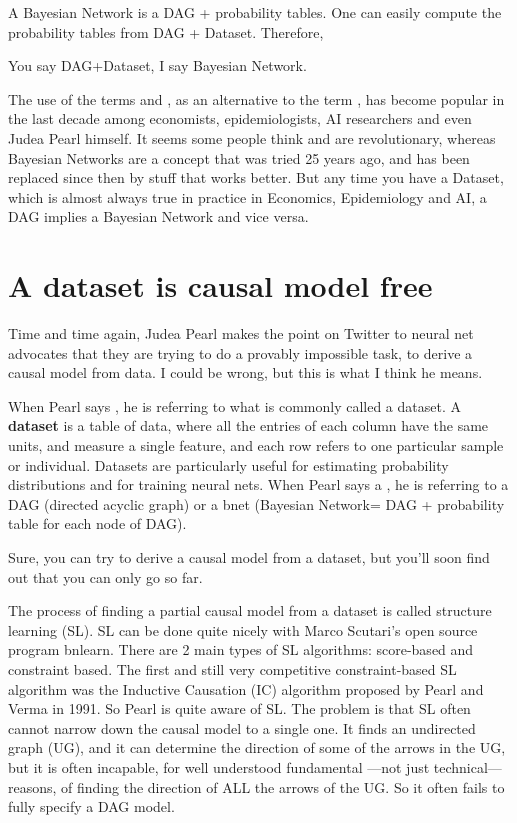  A Bayesian Network is a DAG + probability tables. One can easily compute the
 probability tables from DAG + Dataset. Therefore,

You say DAG+Dataset, I say Bayesian Network.

The use of the terms  and , as an
alternative to the term
, has become popular in the last decade
among economists, epidemiologists,
AI researchers and even Judea Pearl himself. It seems some
people think  and  are revolutionary,
whereas Bayesian
Networks are a concept that was tried 25 years ago, and has been replaced
since then by stuff that works better. But any time you have a Dataset, which
is almost always true in practice in Economics,
Epidemiology  and AI, a DAG implies a
Bayesian Network and vice versa.



\section{A dataset is causal model free}
Time and time again, Judea Pearl makes the point on Twitter to neural net
advocates that they are trying to do a provably impossible task,
 to derive a
causal model from data. I could be wrong, but this is what I think he means.

When Pearl says , he is referring to what is commonly called a
dataset.
A {\bf dataset} is a table of data, where all the entries of each column have
the
same units, and measure a single feature, and each row refers to one
particular sample or individual. Datasets are particularly useful for
estimating probability distributions and for training neural nets. When Pearl
says a , he is referring to a DAG (directed acyclic
graph) or a
bnet
(Bayesian Network= DAG + probability table for each node of DAG).

Sure, you can try to derive a causal model from a dataset,
 but you’ll soon find
 out
that you can only go so far.

The process of finding a partial causal model from a dataset is called
structure
learning (SL).  SL can be done quite nicely with Marco Scutari’s open source
program bnlearn. There are 2 main types of SL algorithms: score-based and
constraint based. The first and still very competitive constraint-based SL
algorithm was the Inductive Causation (IC) algorithm proposed by Pearl and
Verma in 1991. So Pearl is quite aware of SL. The problem is that SL often
cannot narrow down the causal model to a single one.
It finds an undirected
graph
(UG), and it can determine the direction of some of the arrows in the UG, but
it is often incapable, for well understood fundamental
---not just technical---
reasons, of finding the direction of ALL the arrows of the UG. So it often
fails to fully specify a DAG model.

